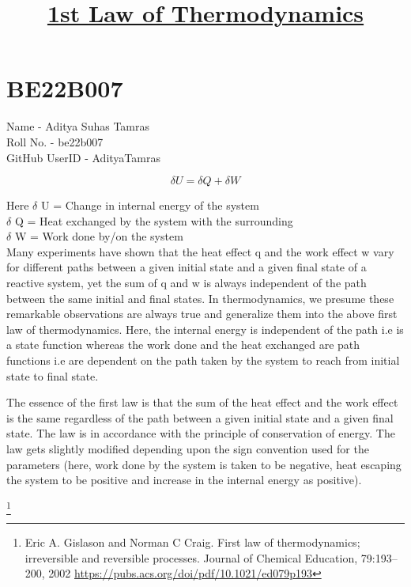 \section{BE22B007}

Name - Aditya Suhas Tamras \\
Roll No. - be22b007 \\
GitHub UserID - AdityaTamras \\ 

\title{\textbf{\underline{1st Law of Thermodynamics}}}

\begin{equation}
\delta U = \delta Q + \delta W
\end{equation}

Here $\delta$ U = Change in internal energy of the system \\
$\delta$ Q = Heat exchanged by the system with the surrounding \\
$\delta$ W = Work done by/on the system \\


Many experiments have shown that the heat effect q and
the work effect w vary for different paths between a given
initial state and a given final state of a reactive system, yet the
sum of q and w is always independent of the path between
the same initial and final states. In thermodynamics, we
presume these remarkable observations are always true and
generalize them into the above first law of thermodynamics. Here, the internal energy is independent of the path i.e is a state function whereas the work done and the heat exchanged are path functions i.e are dependent on the path taken by the system to reach from initial state to final state. 

The essence of the first law is that the sum of the heat effect and the work effect is the same regardless of the path between a given initial state
and a given final state. The law is in accordance with the principle of conservation of energy. The law gets slightly modified depending upon the sign convention used for the parameters (here, work done by the system is taken to be negative, heat escaping the system to be positive and increase in the internal energy as positive).

\footnote{
Eric A. Gislason and Norman C Craig. First law of thermodynamics; irreversible
and reversible processes. Journal of Chemical Education, 79:193–200, 2002
\url{https://pubs.acs.org/doi/pdf/10.1021/ed079p193}
}
